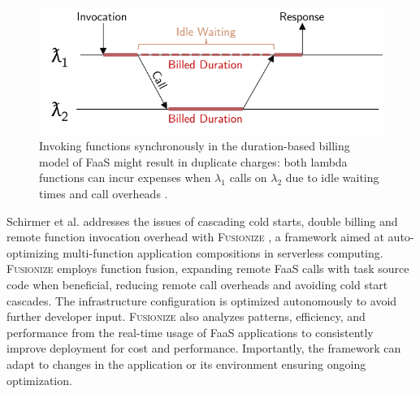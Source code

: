 \begin{figure}
    \centering
    \includegraphics[width=\linewidth]{../figures/doublespending}
    \caption{
        Invoking functions synchronously in the duration-based billing model of
        FaaS might result in duplicate charges: both lambda functions can incur
        expenses when ${\lambda}_{1}$ calls on ${\lambda}_{2}$ due to idle
        waiting times and call overheads \cite{schirmer2023fusionize}.
    }
    \label{fig:doublespending}
\end{figure}


Schirmer et al. addresses the issues of cascading cold starts, double billing
and remote function invocation overhead with \textsc{Fusionize}
\cite{schirmer2023fusionize}, a framework aimed at auto-optimizing
multi-function application compositions in serverless computing.
\textsc{Fusionize} employs function fusion, expanding remote FaaS calls with
task source code when beneficial, reducing remote call overheads and avoiding
cold start cascades. The infrastructure configuration is optimized autonomously
to avoid further developer input. \textsc{Fusionize} also analyzes patterns,
efficiency, and performance from the real-time usage of FaaS applications to
consistently improve deployment for cost and performance. Importantly, the
framework can adapt to changes in the application or its environment ensuring
ongoing optimization.

